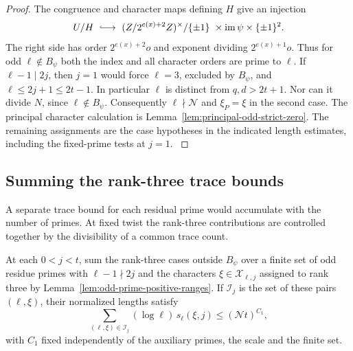 \begin{proof}
The congruence and character maps defining \(H\) give an injection
\[
 U/H\ \lhook\joinrel\longrightarrow\
  (\Z/2^{e(x)+2}\Z)^\times/\{\pm1\}
      \ \times\operatorname{im}\psi\times\{\pm1\}^2 .
\]
The right side has order \(2^{e(x)+2}o\) and exponent dividing
\(2^{e(x)+1}o\). Thus for odd \(\ell\notin B_\psi\) both the index
and all character orders are prime to \(\ell\). If \(\ell-1\mid2j\),
then \(j=1\) would force \(\ell=3\), excluded by \(B_\psi\), and
\(\ell\le 2j+1\le2t-1\). In particular \(\ell\) is distinct from
\(q,d>2t+1\). Nor can it divide \(N\), since \(\ell\notin B_\psi\).
Consequently \(\ell\nmid\mathcal N\) and \(\xi_P=\xi\) in the second
case. The principal character calculation is
Lemma~\ref{lem:principal-odd-strict-zero}. The remaining assignments
are the case hypotheses in the indicated length estimates, including
the fixed-prime tests at \(j=1\).
\label{cor:ordinary-odd-primes-2}
\end{proof}

\subsection{Summing the rank-three trace bounds}
\label{subsec:odd-prime-trace}

A separate trace bound for each residual prime would accumulate with the number of primes. At fixed twist the rank-three contributions are controlled together by the divisibility of a common trace count.

\begin{proposition}
At each \(0<j<t\), sum the rank-three cases outside \(B_\psi\)
over a finite set of odd residue primes with \(\ell-1\nmid2j\)
and the characters \(\xi\in\mathcal X_{\ell,j}\) assigned to rank three by Lemma~\ref{lem:odd-prime-positive-ranges}. If \(\mathcal I_j\) is the set of these pairs \((\ell,\xi)\), their normalized lengths satisfy 
\[
 \sum_{(\ell,\xi)\in\mathcal I_j}(\log\ell)\,s_\ell(\xi,j)\le(\mathcal N t)^{C_1},
\]
 with \(C_1\) fixed independently of
the auxiliary primes, the scale and the finite set.
\end{proposition}

